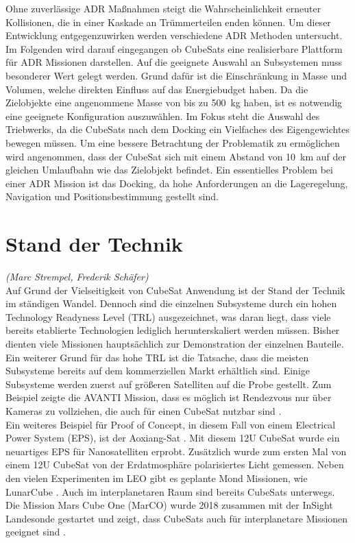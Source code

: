 Ohne zuverlässige ADR Maßnahmen steigt die Wahrscheinlichkeit erneuter Kollisionen, die in einer Kaskade an Trümmerteilen enden können. Um dieser Entwicklung entgegenzuwirken werden verschiedene ADR Methoden untersucht.
Im Folgenden wird darauf eingegangen ob CubeSats eine realisierbare Plattform für ADR Missionen darstellen.
Auf die geeignete Auswahl an Subsystemen muss besonderer Wert gelegt werden. Grund dafür ist die Einschränkung in Masse und Volumen, welche direkten Einfluss auf das Energiebudget haben. Da die Zielobjekte eine angenommene Masse von bis zu \SI{500}{\kilogram} haben, ist es notwendig eine geeignete Konfiguration auszuwählen. Im Fokus steht die Auswahl des Triebwerks, da die CubeSats nach dem Docking ein Vielfaches des Eigengewichtes bewegen müssen. Um eine bessere Betrachtung der Problematik zu ermöglichen wird angenommen, dass der CubeSat sich mit einem Abstand von \SI{10}{\kilo\metre} auf der gleichen Umlaufbahn wie das Zielobjekt befindet. Ein essentielles Problem bei einer ADR Mission ist das Docking, da hohe Anforderungen an die Lageregelung, Navigation und Positionsbestimmung gestellt sind. 

		\section{Stand der Technik}
		\hfill\emph{(Marc Strempel, Frederik Schäfer)}	\\	
Auf Grund der Vielseitigkeit von CubeSat Anwendung ist der Stand der Technik im ständigen Wandel. Dennoch sind die einzelnen Subsysteme durch ein hohen Technology Readyness Level (TRL) ausgezeichnet, was daran liegt, dass viele bereits etablierte Technologien lediglich herunterskaliert werden müssen. Bisher dienten viele Missionen hauptsächlich zur Demonstration der einzelnen Bauteile. Ein weiterer Grund für das hohe TRL ist die Tatsache, dass die meisten Subsysteme bereits auf dem kommerziellen Markt erhältlich sind. Einige Subsysteme werden zuerst auf größeren Satelliten auf die Probe gestellt. Zum Beispiel zeigte die AVANTI Mission, dass es möglich ist Rendezvous nur über Kameras zu vollziehen, die auch für einen CubeSat nutzbar sind \cite{Gaias.2018,Gaias.2018b}.\\ Ein weiteres Beispiel für Proof of Concept, in diesem Fall von einem Electrical Power System (EPS), ist der Aoxiang-Sat \cite{Peng.2018}. Mit diesem 12U CubeSat wurde ein neuartiges EPS für Nanosatelliten erprobt. Zusätzlich wurde zum ersten Mal von einem 12U CubeSat von der Erdatmosphäre polarisiertes Licht gemessen. Neben den vielen Experimenten im LEO gibt es geplante Mond Missionen, wie LunarCube \cite{Tsay.2015}. Auch im interplanetaren Raum sind bereits CubeSats unterwegs. Die Mission Mars Cube One (MarCO) wurde 2018 zusammen mit der InSight Landesonde gestartet und zeigt, dass CubeSats auch für interplanetare Missionen geeignet sind \cite{Klesh.2018}.

